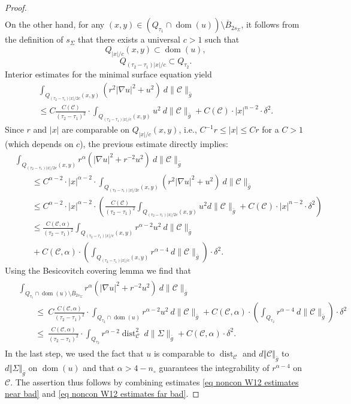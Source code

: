 \documentclass[11pt, letterpaper, reqno]{amsart}
\numberwithin{equation}{section}
\theoremstyle{remark}
\newcommand{\cC}{\mathcal{C}}
\newcommand{\dist}{\operatorname{dist}}
\DeclareMathOperator{\Dom}{dom}
\begin{document}
\begin{proof}
\begin{multline}
\end{multline}
On the other hand, for any $(x,y) \in  (Q_{\tau_1} \cap \Dom(u))\setminus \overline B_{2s_\Sigma}$, it follows from the definition of $s_\Sigma$ that there exists a universal $c > 1$ such that
\[ Q_{|x|/c}(x,y) \subset \Dom(u), \]
\[ Q_{(\tau_2-\tau_1)|x|/c} \subset Q_{\tau_2}. \]
Interior estimates for the minimal surface equation yield 
\begin{multline*}
	\int_{Q_{(\tau_2-\tau_1) |x|/2c}(x,y)}  (r^2|\nabla u|^2 + u^2) \ d\|\cC\|_{\bar g} \\
	\leq C\frac{C(\cC)}{(\tau_2-\tau_1)^2} \cdot \int_{Q_{(\tau_2-\tau_1)|x|/c}(x,y)} u^2 \ d\|\cC\|_{\bar g} +C(\cC) \cdot |x|^{n-2} \cdot \delta^2.
\end{multline*}
Since $r$ and $|x|$ are comparable on $Q_{|x|/c}(x,y)$, i.e., $C^{-1} r \leq |x| \leq C r$ for a $C > 1$ (which depends on $c$), the previous estimate directly implies:
\begin{align*}
	& \int_{Q_{(\tau_2-\tau_1)|x|/2c}(x,y)}  r^\alpha (|\nabla u|^2 + r^{-2} u^2) \ d\|\cC\|_{\bar g} \\ 
	& \qquad \leq C^{\alpha-2} \cdot |x|^{\alpha-2} \cdot \int_{Q_{(\tau_2-\tau_1) |x|/2c}(x,y)}  (r^2 |\nabla u|^2 + u^2) \ d\|\cC\|_{\bar g} \\ 
	& \qquad \leq C^{\alpha-2} \cdot |x|^{\alpha-2} \cdot \left( \frac{C(\cC)}{(\tau_2-\tau_1)^2} \int_{Q_{(\tau_2-\tau_1) |x|/2c}(x,y)} u^2d\|\cC\|_{\bar g} + C(\cC) \cdot |x|^{n-2} \cdot \delta^2 \right) \\
	& \qquad \leq \frac{C(\cC,\alpha)}{(\tau_2-\tau_1)^2} \int_{Q_{(\tau_2-\tau_1) |x|/c}(x,y)} r^{\alpha-2}u^2 \ d\|\cC\|_{\bar g} \\
    & \qquad + C(\cC,\alpha) \cdot \left( \int_{Q_{(\tau_2-\tau_1) |x|/c}(x,y)} r^{\alpha - 4} \ d\|\cC\|_{\bar g} \right) \cdot \delta^2.
\end{align*}
Using the Besicovitch covering lemma we find that
\begin{align}\label{eq noncon W12 estimates far bad}
\begin{split}
	& \int_{Q_{\tau_1} \cap \Dom(u) \setminus \overline B_{2s_\Sigma}} r^\alpha(|\nabla u|^2 + r^{-2}u^2)\ d\|\cC\|_{\bar g} \\ 
	& \qquad \leq\ C \frac{C(\cC, \alpha)}{(\tau_2-\tau_1)^2} \cdot \int_{Q_{\tau_2} \cap \Dom(u)} r^{\alpha-2} u^2 \ d\|\cC\|_{\bar g} + C(\cC,\alpha) \cdot \left(\int_{Q_{\tau_2}} r^{\alpha-4} \ d\|\cC\|_{\bar g}\right) \cdot \delta^2 \\
	& \qquad \leq\ \frac{C(\cC, \alpha)}{(\tau_2-\tau_1)^2} \cdot \int_{Q_{\tau_2}} r^{\alpha-2} \dist_\cC^2 \ d\|\Sigma\|_{\bar g} + C(\cC,\alpha) \cdot \delta^2.
\end{split}
\end{align}
In the last step, we used the fact that $u$ is comparable to $\dist_\cC$ and $d\Vert \cC \Vert_{\bar g}$ to $d\Vert \Sigma \Vert_{\bar g}$ on $\Dom(u)$ and that $\alpha > 4-n_\circ$ guarantees the integrability of $r^{\alpha-4}$ on $\cC$. The assertion thus follows by combining estimates \eqref{eq noncon W12 estimates near bad} and  \eqref{eq noncon W12 estimates far bad}.
 \end{proof}
\end{document}
